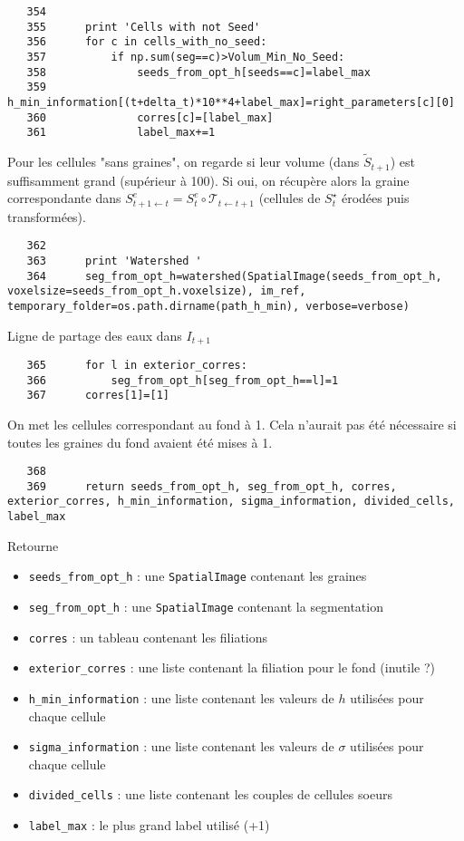 \documentclass{article}
\def \mycolor {red}
\begin{document}
\color{black}
\begin{verbatim}
   354	
   355	    print 'Cells with not Seed'
   356	    for c in cells_with_no_seed:
   357	        if np.sum(seg==c)>Volum_Min_No_Seed:
   358	            seeds_from_opt_h[seeds==c]=label_max
   359	            h_min_information[(t+delta_t)*10**4+label_max]=right_parameters[c][0]
   360	            corres[c]=[label_max]
   361	            label_max+=1
\end{verbatim} 
\color{\mycolor}
Pour les cellules "sans graines", on regarde si leur volume (dans $\tilde{S}_{t+1}$) est suffisamment grand (sup\'erieur \`a 100). Si oui, on r\'ecup\`ere alors la graine correspondante dans $S^e_{t+1 \leftarrow t} = S^e_t \circ \mathcal{T}_{t \leftarrow t+1}$ (cellules de $S^{\star}_t$ \'erod\'ees puis transform\'ees).
\color{black}
\begin{verbatim}
   362	
   363	    print 'Watershed '
   364	    seg_from_opt_h=watershed(SpatialImage(seeds_from_opt_h, voxelsize=seeds_from_opt_h.voxelsize), im_ref, temporary_folder=os.path.dirname(path_h_min), verbose=verbose)
\end{verbatim} 
\color{\mycolor}
Ligne de partage des eaux dans $I_{t+1}$
\color{black}
\begin{verbatim}
   365	    for l in exterior_corres:
   366	        seg_from_opt_h[seg_from_opt_h==l]=1
   367	    corres[1]=[1]
\end{verbatim} 
\color{\mycolor}
On met les cellules correspondant au fond \`a 1. Cela n'aurait pas \'et\'e n\'ecessaire si toutes les graines du fond avaient \'et\'e mises \`a 1.
\color{black}
\begin{verbatim}
   368	
   369	    return seeds_from_opt_h, seg_from_opt_h, corres, exterior_corres, h_min_information, sigma_information, divided_cells, label_max    
\end{verbatim}
\color{\mycolor}
Retourne
\begin{itemize}
\itemsep -1ex
\item \verb|seeds_from_opt_h| : une \texttt{SpatialImage} contenant les graines
\item \verb|seg_from_opt_h| : une \texttt{SpatialImage} contenant la segmentation
\item \verb|corres| : un tableau contenant les filiations
\item \verb|exterior_corres| : une liste contenant la filiation pour le fond (inutile ?)
\item \verb|h_min_information| : une liste contenant les valeurs de $h$ utilisées pour chaque cellule
\item \verb|sigma_information| : une liste contenant les valeurs de $\sigma$ utilisées pour chaque cellule
\item \verb|divided_cells| : une liste contenant les couples de cellules soeurs
\item \verb|label_max| : le plus grand label utilisé (+1)
\end{itemize}
\color{black}
\end{document}
